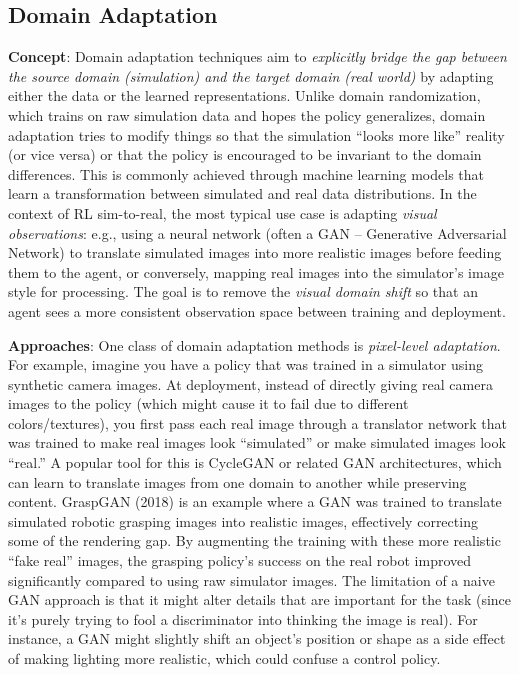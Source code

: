 \subsection{Domain Adaptation}
\textbf{Concept}: Domain adaptation techniques aim to \textit{explicitly bridge the gap between the source domain (simulation) and the target domain (real world)} by adapting either the data or the learned representations. Unlike domain randomization, which trains on raw simulation data and hopes the policy generalizes, domain adaptation tries to modify things so that the simulation “looks more like” reality (or vice versa) or that the policy is encouraged to be invariant to the domain differences. This is commonly achieved through machine learning models that learn a transformation between simulated and real data distributions. In the context of RL sim-to-real, the most typical use case is adapting \textit{visual observations}: e.g., using a neural network (often a GAN – Generative Adversarial Network) to translate simulated images into more realistic images before feeding them to the agent, or conversely, mapping real images into the simulator’s image style for processing. The goal is to remove the \textit{visual domain shift} so that an agent sees a more consistent observation space between training and deployment.

\textbf{Approaches}: One class of domain adaptation methods is \textit{pixel-level adaptation}. For example, imagine you have a policy that was trained in a simulator using synthetic camera images. At deployment, instead of directly giving real camera images to the policy (which might cause it to fail due to different colors/textures), you first pass each real image through a translator network that was trained to make real images look “simulated” or make simulated images look “real.” A popular tool for this is CycleGAN or related GAN architectures, which can learn to translate images from one domain to another while preserving content. GraspGAN (2018) is an example where a GAN was trained to translate simulated robotic grasping images into realistic images, effectively correcting some of the rendering gap. By augmenting the training with these more realistic “fake real” images, the grasping policy’s success on the real robot improved significantly compared to using raw simulator images. The limitation of a naive GAN approach is that it might alter details that are important for the task (since it’s purely trying to fool a discriminator into thinking the image is real). For instance, a GAN might slightly shift an object’s position or shape as a side effect of making lighting more realistic, which could confuse a control policy.

